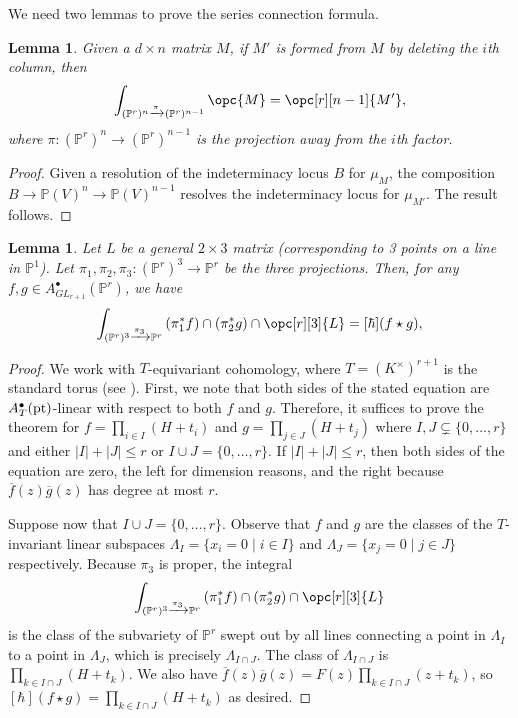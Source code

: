 \documentclass[12pt]{amsart}
\newcommand{\mb}{\mathbb}
\newcommand{\pt}{{\rm pt}}
\theoremstyle{plain}
\newtheorem{Lem}[Thm]{Lemma}
\theoremstyle{definition}
\theoremstyle{remark}
\begin{document}
We need two lemmas to prove the series connection formula.
\begin{Lem}\label{integrateaway}
Given a $d \times n$ matrix $M$, if $M'$ is formed from $M$ by deleting the $i$th column, then $$\int_{(\mb{P}^r)^n \xrightarrow{\pi} (\mb{P}^r)^{n-1}} \opc{M}=\opc[r][n-1]{M'},$$ where $\pi:(\mb{P}^r)^n \to (\mb{P}^r)^{n-1}$ is the projection away from the $i$th factor.
\end{Lem}
\begin{proof}
Given a resolution of the indeterminacy locus $B$ for $\mu_M$, the composition $B \to \mb{P}(V)^n \to \mb{P}(V)^{n-1}$ resolves the indeterminacy locus for $\mu_{M'}$. The result follows.
\end{proof}

\begin{Lem}
\label{SCL}
Let $L$ be a general $2 \times 3$ matrix (corresponding to 3 points on a line in $\mb{P}^1$). Let $\pi_1,\pi_2,\pi_3: (\mb{P}^r)^3\to \mb{P}^r$ be the three projections. Then, for any $f,g \in A^\bullet_{GL_{r+1}}(\mb{P}^r)$, we have
\begin{align*}
\int_{(\mb{P}^r)^3\xrightarrow{\pi_3}\mb{P}^r}{(\pi_1^{*}f) \cap (\pi_2^{*}g) \cap \opc[r][3]{L}}=[\hbar](f \star g),
\end{align*}

\end{Lem}

\begin{proof}
We work with $T$-equivariant cohomology, where $T = (K^\times)^{r+1}$ is the standard torus (see ). First, we note that both sides of the stated equation are $A_{T}^{\bullet}(\pt)$-linear with respect to both $f$ and $g$. Therefore, it suffices to prove the theorem for $f=\prod_{i\in I}(H+t_i)$ and $g=\prod_{j\in J}(H+t_j)$ where $I,J\subsetneq \{0,\ldots,r\}$ and either $|I|+|J|\le r$ or $I \cup J=\{0,\ldots,r\}$. If $|I|+|J|\leq r$, then both sides of the equation are zero, the left for dimension reasons, and the right because $\overline{f}(z)\overline{g}(z)$ has degree at most $r$.

Suppose now that $I \cup J = \{0, \ldots, r\}$. Observe that $f$ and $g$ are the classes of the $T$-invariant linear subspaces $\Lambda_I = \{x_i=0\mid i\in I\}$ and $\Lambda_J=\{x_j=0\mid j\in J\}$ respectively. Because $\pi_3$ is proper, the integral \[\int_{(\mb{P}^r)^3\xrightarrow{\pi_3}\mb{P}^r}{(\pi_1^{*}f) \cap (\pi_2^{*}g) \cap \opc[r][3]{L}}\] is the class of the subvariety of $\mb{P}^r$ swept out by all lines connecting a point in $\Lambda_I$ to a point in $\Lambda_J$, which is precisely $\Lambda_{I \cap J}$. The class of $\Lambda_{I \cap J}$ is $\prod_{k\in I \cap J}(H+t_k)$. We also have $\overline{f}(z)\overline{g}(z)=F(z)\prod_{k \in I \cap J} (z+t_k)$, so $[\hbar](f \star g)=\prod_{k\in I \cap J}(H+t_k)$ as desired.
\end{proof}
\end{document}
